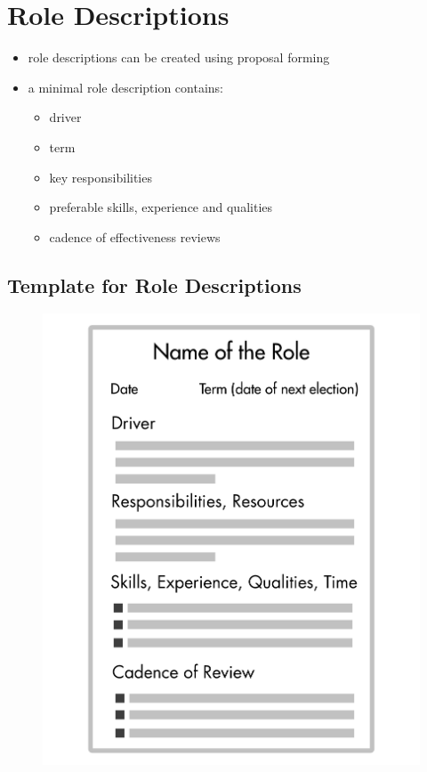 \section{Role Descriptions}
\label{roledescriptions}

\begin{itemize}
\item role descriptions can be created using proposal forming

\item a minimal role description contains:

\begin{itemize}
\item driver

\item term

\item key responsibilities

\item preferable skills, experience and qualities

\item cadence of effectiveness reviews

\end{itemize}

\end{itemize}

\subsection{Template for Role Descriptions}
\label{templateforroledescriptions}

\begin{figure}[htbp]
\centering
\includegraphics[keepaspectratio,width=\textwidth,height=0.75\textheight]{img/people-and-roles/role-description-template.png}
\end{figure}

